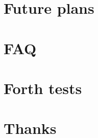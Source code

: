 \documentclass[a4paper,notitlepage]{report}
\begin{document}
\chapter{Future plans}


\appendix

\chapter{FAQ}
        

\chapter{Forth tests}
        

\chapter{Thanks}
        



\printindex
\end{document}
